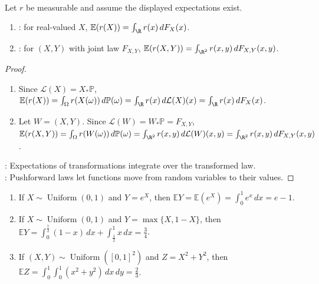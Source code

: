 \begin{theorem} \label{thm:law-of-unconscious-statistician} \\
Let $r$ be measurable and assume the displayed expectations exist.
\begin{enumerate}[label=(\roman*)]
\setlength{\itemsep}{0pt}
\item {}: for real-valued $X$, $\mathbb{E}(r(X))=\int_{\R}r(x)\,dF_X(x)$.
\item {}: for $(X,Y)$ with joint law $F_{X,Y}$, $\mathbb{E}(r(X,Y))=\int_{\R^2}r(x,y)\,dF_{X,Y}(x,y)$.
\end{enumerate}
\begin{proof}
\begin{enumerate}[label=(\roman*)]
\setlength{\itemsep}{0pt}
\item Since $\mathcal{L}(X)=X_\ast\mathbb{P}$, $\mathbb{E}(r(X))=\int_\Omega r(X(\omega))\,d\mathbb{P}(\omega)=\int_{\R}r(x)\,d\mathcal{L}(X)(x)=\int_{\R}r(x)\,dF_X(x)$.
\item Let $W=(X,Y)$. Since $\mathcal{L}(W)=W_\ast\mathbb{P}=F_{X,Y}$,\\
$\mathbb{E}(r(X,Y))=\int_\Omega r(W(\omega))\,d\mathbb{P}(\omega)=\int_{\R^2}r(x,y)\,d\mathcal{L}(W)(x,y)=\int_{\R^2}r(x,y)\,dF_{X,Y}(x,y)$.
\end{enumerate}
: Expectations of transformations integrate over the transformed law.\\
: Pushforward laws let functions move from random variables to their values.
\end{proof}
\end{theorem}

\begin{example} \label{ex:lotus-transform-examples} 
\begin{enumerate}[label=(\roman*)]
\setlength{\itemsep}{0pt}
\item If $X\sim\operatorname{Uniform}(0,1)$ and $Y=e^X$, then $\mathbb{E}Y=\mathbb{E}(e^X)=\int_0^1e^x\,dx=e-1$.
\item If $X\sim\operatorname{Uniform}(0,1)$ and $Y=\max\{X,1-X\}$, then $\mathbb{E}Y=\int_0^{\frac{1}{2}}(1-x)\,dx+\int_{\frac{1}{2}}^{1}x\,dx=\frac{3}{4}$.
\item If $(X,Y)\sim\operatorname{Uniform}([0,1]^2)$ and $Z=X^2+Y^2$, then $\mathbb{E}Z=\int_0^1\int_0^1(x^2+y^2)\,dx\,dy=\frac{2}{3}$.
\end{enumerate}
\end{example}

